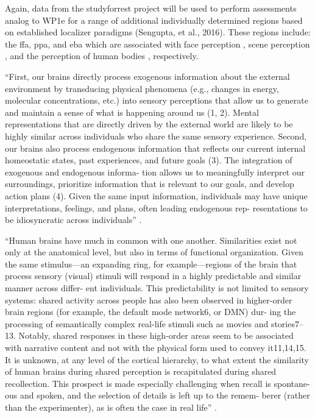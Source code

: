 Again, data from the studyforrest project will be used to perform assessments
analog to WP1e for a range of additional individually determined regions based
on established localizer paradigms (Sengupta, et al., 2016).
%
These regions include: the \ac{ffa}, \ac{ppa}, and \ac{eba}  which are
associated with face perception \citep{kanwisher1997ffa,
pitcher2011occipitalfacearea}, scene perception \citep{epstein1998ppa}, and the
perception of human bodies \citep{downing2001bodyarea}, respectively.

``First, our brains directly process exogenous information about the external
environment by transducing physical phenomena (e.g., changes in energy,
molecular concentrations, etc.) into sensory perceptions that allow us to
generate and maintain a sense of what is happening around us (1, 2). Mental
representations that are directly driven by the external world are likely to be
highly similar across individuals who share the same sensory experience. Second,
our brains also process endogenous information that reflects our current
internal homeostatic states, past experiences, and future goals (3). The
integration of exogenous and endogenous informa- tion allows us to meaningfully
interpret our surroundings, prioritize information that is relevant to our
goals, and develop action plans (4). Given the same input information,
individuals may have unique interpretations, feelings, and plans, often leading
endogenous rep- resentations to be idiosyncratic across individuals''
\citep{chang2021endogenous}.

``Human brains have much in common with one another. Similarities exist not only
at the anatomical level, but also in terms of functional organization. Given the
same stimulus—an expanding ring, for example—regions of the brain that process
sensory (visual) stimuli will respond in a highly predictable and similar manner
across differ- ent individuals. This predictability is not limited to sensory
systems: shared activity across people has also been observed in higher-order
brain regions (for example, the default mode network6, or DMN) dur- ing the
processing of semantically complex real-life stimuli such as movies and
stories7–13. Notably, shared responses in these high-order areas seem to be
associated with narrative content and not with the physical form used to convey
it11,14,15. It is unknown, at any level of the cortical hierarchy, to what
extent the similarity of human brains during shared perception is recapitulated
during shared recollection. This prospect is made especially challenging when
recall is spontane- ous and spoken, and the selection of details is left up to
the remem- berer (rather than the experimenter), as is often the case in real
life'' \citep{chen2017shared}.


